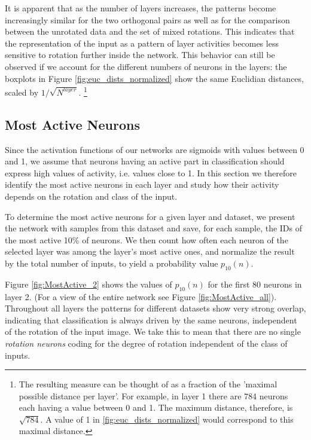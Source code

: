 \documentclass[10pt,a4paper]{article}
\begin{document}
\noindent It is apparent that as the number of layers increases, the patterns become increasingly similar for the two orthogonal pairs as well as for the comparison between the unrotated data and the set of mixed rotations. This indicates that the representation of the input as a pattern of layer activities becomes less sensitive to rotation further inside the network. This behavior can still be observed if we account for the different numbers of neurons in the layers: the boxplots in Figure \ref{fig:euc_dists_normalized} show the same Euclidian distances, scaled by $1 / \sqrt{N^{layer}}$.
\footnote{The resulting measure can be thought of as a fraction of the 'maximal possible distance per layer'. For example, in layer 1 there are 784 neurons each having a value between 0 and 1. The maximum distance, therefore, is $\sqrt{784}$. A value of 1 in \ref{fig:euc_dists_normalized} would correspond to this maximal distance.}


\subsection{Most Active Neurons}

\noindent Since the activation functions of our networks are sigmoids with values between 0 and 1, we assume that neurons having an active part in classification should express high values of activity, i.e. values close to 1. In this section we therefore identify the most active neurons in each layer and study how their activity depends on the rotation and class of the input. \newline

\noindent To determine the most active neurons for a given layer and dataset, we present the network with samples from this dataset and save, for each sample, the IDs of the most active 10\% of neurons. We then count how often each neuron of the selected layer was among the layer's most active ones, and normalize the result by the total number of inputs, to yield a probability value $p_{10}(n)$.\newline

\noindent Figure \ref{fig:MostActive_2} shows the values of $p_{10}(n) $ for the first 80 neurons in layer 2. (For a view of the entire network see Figure \ref{fig:MostActive_all}). Throughout all layers the patterns for different datasets show very strong overlap,  indicating that classification is always driven by the same neurons, independent of the rotation of the input image. We take this to mean that there are no single \textit{rotation neurons} coding for the degree of rotation independent of the class of inputs. 
\end{document}
